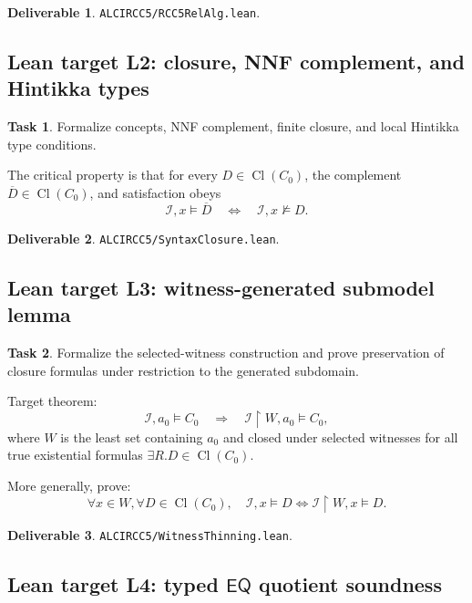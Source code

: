 \documentclass[11pt]{article}
\newcommand{\Cl}{\operatorname{Cl}}
\newcommand{\EQ}{\mathsf{EQ}}
\theoremstyle{definition}
\newtheorem{task}{Task}
\newtheorem{deliverable}{Deliverable}
\theoremstyle{plain}
\begin{document}
\begin{deliverable}
\texttt{ALCIRCC5/RCC5RelAlg.lean}.
\end{deliverable}

\subsection{Lean target L2: closure, NNF complement, and Hintikka types}

\begin{task}
Formalize concepts, NNF complement, finite closure, and local Hintikka type conditions.
\end{task}

The critical property is that for every \(D\in\Cl(C_0)\), the complement \(\overline D\in\Cl(C_0)\), and satisfaction obeys
\[
\mathcal I,x\models \overline D
\quad\Longleftrightarrow\quad
\mathcal I,x\not\models D.
\]

\begin{deliverable}
\texttt{ALCIRCC5/SyntaxClosure.lean}.
\end{deliverable}

\subsection{Lean target L3: witness-generated submodel lemma}

\begin{task}
Formalize the selected-witness construction and prove preservation of closure formulas under restriction to the generated subdomain.
\end{task}

Target theorem:
\[
\mathcal I,a_0\models C_0
\quad\Longrightarrow\quad
\mathcal I\upharpoonright W,a_0\models C_0,
\]
where \(W\) is the least set containing \(a_0\) and closed under selected witnesses for all true existential formulas \(\exists R.D\in\Cl(C_0)\).

More generally, prove:
\[
\forall x\in W,\forall D\in\Cl(C_0),
\quad
\mathcal I,x\models D
\Longleftrightarrow
\mathcal I\upharpoonright W,x\models D.
\]

\begin{deliverable}
\texttt{ALCIRCC5/WitnessThinning.lean}.
\end{deliverable}

\subsection{Lean target L4: typed \(\EQ\) quotient soundness}
\end{document}
